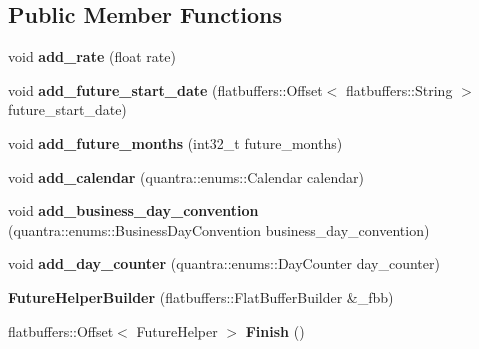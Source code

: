 \subsection*{Public Member Functions}
\begin{DoxyCompactItemize}
\item 
\mbox{\label{structquantra_1_1FutureHelperBuilder_a6d5bbea46f7fe8b1b097e724997a8529}} 
void {\bfseries add\+\_\+rate} (float rate)
\item 
\mbox{\label{structquantra_1_1FutureHelperBuilder_a700de9640057f7d48f10b501efcf2e00}} 
void {\bfseries add\+\_\+future\+\_\+start\+\_\+date} (flatbuffers\+::\+Offset$<$ flatbuffers\+::\+String $>$ future\+\_\+start\+\_\+date)
\item 
\mbox{\label{structquantra_1_1FutureHelperBuilder_ac36e7bbed8cc2b7503b2be4c63f79975}} 
void {\bfseries add\+\_\+future\+\_\+months} (int32\+\_\+t future\+\_\+months)
\item 
\mbox{\label{structquantra_1_1FutureHelperBuilder_a4b2036f2a3eb7720c09e2ac9d6ded69c}} 
void {\bfseries add\+\_\+calendar} (quantra\+::enums\+::\+Calendar calendar)
\item 
\mbox{\label{structquantra_1_1FutureHelperBuilder_a834f0483fee661005f8150ad183b463b}} 
void {\bfseries add\+\_\+business\+\_\+day\+\_\+convention} (quantra\+::enums\+::\+Business\+Day\+Convention business\+\_\+day\+\_\+convention)
\item 
\mbox{\label{structquantra_1_1FutureHelperBuilder_a25b11febf12f81a03ba8b11282e53cb0}} 
void {\bfseries add\+\_\+day\+\_\+counter} (quantra\+::enums\+::\+Day\+Counter day\+\_\+counter)
\item 
\mbox{\label{structquantra_1_1FutureHelperBuilder_a5939331cff88984e6e99eeee56c2982b}} 
{\bfseries Future\+Helper\+Builder} (flatbuffers\+::\+Flat\+Buffer\+Builder \&\+\_\+fbb)
\item 
\mbox{\label{structquantra_1_1FutureHelperBuilder_a2329b11b5032e968e5d37994a5d9c730}} 
flatbuffers\+::\+Offset$<$ Future\+Helper $>$ {\bfseries Finish} ()
\end{DoxyCompactItemize}
